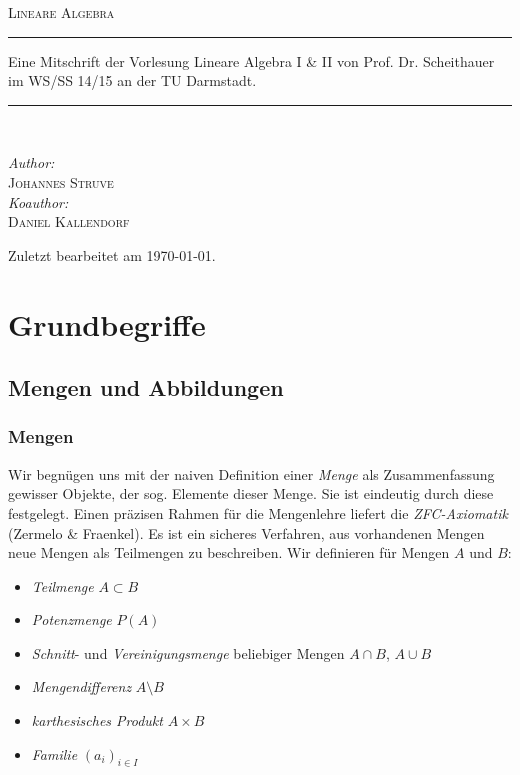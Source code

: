 \documentclass[a4paper,12pt,fleqn]{scrartcl}
\theoremstyle{definition}
\theoremstyle{plain}
\theoremstyle{remark}
\begin{document}
\begin{titlepage}
\begin{center}
\textsc{\LARGE Lineare Algebra}\\[2.0cm]
\rule{\linewidth}{0.5mm}
Eine Mitschrift der Vorlesung Lineare Algebra I \& II von Prof. Dr. Scheithauer im WS/SS 14/15 an der TU Darmstadt.
\rule{\linewidth}{0.5mm}\\[2.0cm]
\begin{minipage}{0.4\textwidth}
\begin{flushleft}
\large \emph{Author:}\\\textsc{Johannes Struve}\\[1.0cm]
\large \emph{Koauthor:}\\\textsc{Daniel Kallendorf}
\end{flushleft}
\end{minipage}
\vfill
Zuletzt bearbeitet am {\large \today}.
\end{center}
\end{titlepage}

\tableofcontents

\newpage

\section{Grundbegriffe}
\subsection{Mengen und Abbildungen}
\subsubsection{Mengen}
Wir begnügen uns mit der naiven Definition einer \emph{Menge} als Zusammenfassung gewisser Objekte, der sog. Elemente dieser Menge. Sie ist eindeutig durch diese festgelegt. Einen präzisen Rahmen für die Mengenlehre liefert die \emph{ZFC-Axiomatik} (Zermelo \& Fraenkel). Es ist ein sicheres Verfahren, aus vorhandenen Mengen neue Mengen als Teilmengen zu beschreiben.
Wir definieren für Mengen $A$ und $B$:
\begin{itemize}
	\item \emph{Teilmenge} $A\subset B$
	\item \emph{Potenzmenge} $P(A)$
	\item \emph{Schnitt}- und \emph{Vereinigungsmenge} beliebiger Mengen $A\cap B$, $A\cup B$
	\item \emph{Mengendifferenz} $A\setminus B$
	\item \emph{karthesisches Produkt} $A\times B$
	\item \emph{Familie} $(a_i)_{i\in I}$
\end{itemize}
\newpage
\end{document}
